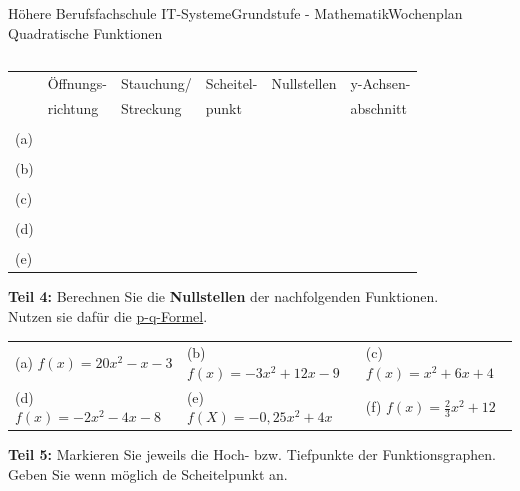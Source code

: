 \documentclass[oneside,openany,headings=optiontotoc,11pt,numbers=noenddot]{scrreprt}
\begin{document}
\begin{worksheet}{Höhere Berufsfachschule IT-Systeme}{Grundstufe - Mathematik}{Wochenplan Quadratische Funktionen}
\begin{framed}
\begin{tabularx}{\textwidth}{XXX}
			\end{tabularx}
			\begin{tabularx}{\textwidth}{X|X|X|X|X|X}
				\small
				& Öffnungs- & Stauchung/ & Scheitel- & Nullstellen & y-Achsen-\\
				& richtung & Streckung & punkt & & abschnitt\\
				\hline
				\hline
				& & & & &\\
				(a) & & & & & \\
				\hline
				& & & & &\\
				(b) & & & & &\\
				\hline
				& & & & &\\
				(c) & & & & &\\
				\hline
				& & & & &\\
				(d)& & & & &\\
				\hline
				& & & & &\\
				(e) & & & & &\\
			\end{tabularx}
		\end{framed}
		\begin{framed}
			\noindent
			\textbf{Teil 4:} Berechnen Sie die \textbf{Nullstellen} der nachfolgenden Funktionen.\\
			Nutzen sie dafür die \underline{p-q-Formel}.
			\par\noindent
			\begin{tabularx}{\textwidth}{XXX}
				(a) \(f(x) = 20x^2-x-3\) & (b) \(f(x) = -3x^2 +12x - 9\) & (c) \(f(x) = x^2 +6x +4\)\\
				(d) \(f(x) = -2x^2 -4x -8\) & (e) \(f(X) = -0,25x^2 +4x\) & (f) \(f(x) = \frac{2}{3}x^2 + 12\)
			\end{tabularx}
		\end{framed}
		\begin{framed}
			\noindent
			\textbf{Teil 5:} Markieren Sie jeweils die Hoch- bzw. Tiefpunkte der Funktionsgraphen.\\
			Geben Sie wenn möglich de Scheitelpunkt an.\\
			\par\noindent

\end{framed}
\end{worksheet}
\end{document}
